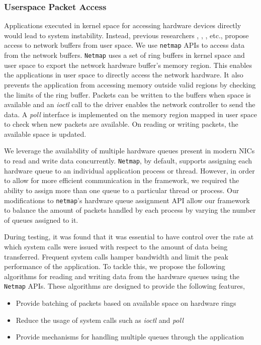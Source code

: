 \documentclass[conference]{IEEEtran}
\begin{document}
\subsubsection{Userspace Packet Access}
Applications executed in kernel space for accessing hardware devices directly would lead to system instability. Instead, previous researchers \cite{Rizzo:2012:RNI:2090147.2103536}, \cite{1564468}, \cite{Krasnyansky}, etc., propose access to network buffers from user space. We use \texttt{netmap} APIs \cite{Rizzo:2012:RNI:2090147.2103536} to access data from the network buffers. \texttt{Netmap} uses a set of ring buffers in kernel space and user space to export the network hardware buffer's memory region. This enables the applications in user space to directly access the network hardware. It also prevents the application from accessing memory outside valid regions by checking the limits of the ring buffer. Packets can be written to the buffers when space is available and an \textit{ioctl} call to the driver enables the network controller to send the data. A \textit{poll} interface is implemented on the memory region mapped in user space to check when new packets are available. On reading or writing packets, the available space is updated.

We leverage the availability of multiple hardware queues present in modern NICs to read and write data concurrently. \texttt{Netmap}, by default, supports assigning each hardware queue to an individual application process or thread. However, in order to allow for more efficient communication in the framework, we required the ability to assign more than one queue to a particular thread or process. Our modifications to \texttt{netmap}'s hardware queue assignment API allow our framework to balance the amount of packets handled by each process by varying the number of queues assigned to it.

During testing, it was found that it was essential to have control over the rate at which system calls were issued with respect to the amount of data being transferred. Frequent system calls hamper bandwidth and limit the peak performance of the application. To tackle this, we propose the following algorithms for reading and writing data from the hardware queues using the \texttt{Netmap} APIs. These algorithms are designed to provide the following features,

\begin{itemize}

\item Provide batching of packets based on available space on hardware rings
\item Reduce the usage of system calls such as \textit{ioctl} and \textit {poll}
\item Provide mechanisms for handling multiple queues through the application

\end{itemize}
\end{document}
